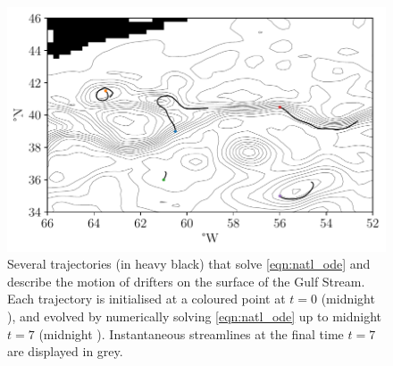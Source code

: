 
\begin{figure}
	\centering
	\includegraphics[width=\textwidth]{chp06_applications/figures/gulf_stream/det_trajs}
	\caption{Several trajectories (in heavy black) that solve \cref{eqn:natl_ode} and describe the motion of drifters on the surface of the Gulf Stream.
		Each trajectory is initialised at a coloured point at \(t = 0\) (midnight ), and evolved by numerically solving \cref{eqn:natl_ode} up to midnight \(t = 7\) (midnight ).
		Instantaneous streamlines at the final time \(t = 7\) are displayed in grey.}
	\label{fig:natl_ode_sols}
\end{figure}

